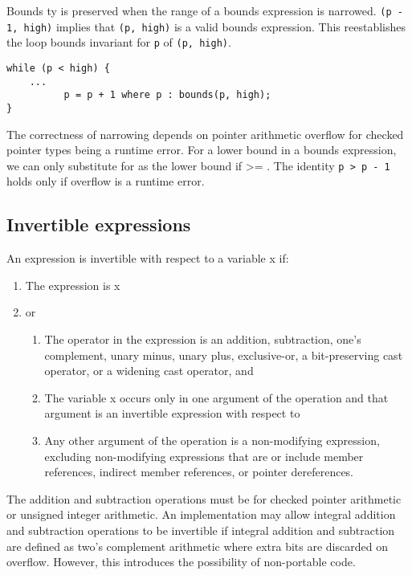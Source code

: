 Bounds ty is preserved when the range of a bounds expression is
narrowed. \texttt{(p - 1, high)} implies that \texttt{(p, high)} is a
valid bounds expression. This reestablishes the loop bounds invariant
for \texttt{p} of \texttt{(p, high)}.

\begin{verbatim}
while (p < high) {
    ...
          p = p + 1 where p : bounds(p, high);
}
\end{verbatim}

The correctness of narrowing depends on pointer arithmetic overflow
for checked pointer types being a runtime error. For a lower bound  in a bounds
expression, we can only substitute  for  as the lower
bound if  \textgreater{}= . The identity \texttt{p > p - 1} 
holds only if overflow is a runtime error.

\subsection{Invertible expressions}
An expression is invertible with respect to a variable x if:

\begin{enumerate}
\item
  The expression is x
\item
  or

  \begin{enumerate}
  \item
    The operator in the expression is an addition, subtraction, one's
    complement, unary minus, unary plus, exclusive-or, a bit-preserving
    cast operator, or a widening cast operator, and
  \item
    The variable x occurs only in one argument of the operation and that
    argument is an invertible expression with respect to 
  \item
    Any other argument of the operation is a non-modifying expression,
    excluding non-modifying expressions that are or include member
    references, indirect member references, or pointer dereferences.
  \end{enumerate}
\end{enumerate}

The addition and subtraction operations must be for checked pointer
arithmetic or unsigned integer arithmetic. An implementation may allow
integral addition and subtraction operations to be invertible if
integral addition and subtraction are defined as two's complement
arithmetic where extra bits are discarded on overflow. However, this
introduces the possibility of non-portable code.

